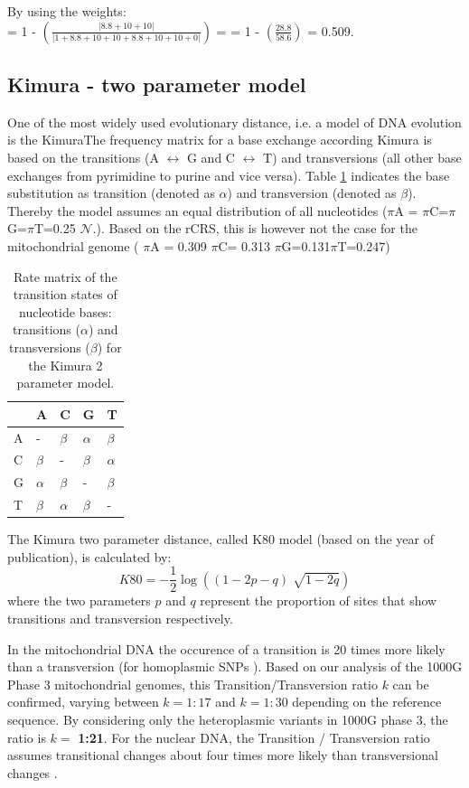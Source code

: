 By using the weights: \\
= 1 - $\left(  \frac{\left| 8.8 + 10 + 10 \right|}{\left| 1 + 8.8 + 10 + 10 + 8.8 + 10 + 10  + 0 \right|}  \right)$  = 
= 1 -  $\left(  \frac{28.8}{58.6} \right)$ = 0.509. 
\subsection{Kimura - two parameter model}
One of the most widely used evolutionary distance, i.e. a model of DNA evolution is the KimuraThe frequency matrix for a base exchange according Kimura \cite{Kimura1980} is based on the transitions (A $\leftrightarrow$ G and C $\leftrightarrow$ T) and transversions (all other base exchanges from pyrimidine to purine and vice versa). Table \ref{hg:kimuratable} indicates the base substitution as transition (denoted as $\alpha$) and transversion (denoted as $\beta$). Thereby the model assumes an equal distribution of all nucleotides ($\pi$A = $\pi$C=$\pi$G=$\pi$T=0.25 $\mathcal{N}.$). Based on the rCRS, this is however not the case for the mitochondrial genome ( $\pi$A = 0.309 $\pi$C= 0.313 $\pi$G=0.131$\pi$T=0.247)
\begin{table}[h]

\centering
\caption{Rate matrix of the transition states of nucleotide bases: transitions ($\alpha$) and transversions ($\beta$) for the Kimura 2 parameter model.}
\label{hg:kimuratable}
\begin{tabular}{lllll}
\hline
   & A&  C   &G  & T\\
\hline

A  & - & $\beta$    & $\alpha$  & $\beta$ \\
C  & $\beta$ &  -   & $\beta$  & $\alpha$ \\
G  & $\alpha$ &  $\beta$    & - & $\beta$ \\
T  & $\beta$ &  $\alpha$    & $\beta$  & - \\
\end{tabular}
\end{table}

The Kimura two parameter distance, called K80 model (based on the year of publication), is calculated by:
\begin{equation}
K80 = - \frac{1}{2} \log((1- 2p -q ) \sqrt[]{1-2q})
\end{equation}
where the two parameters $p$ and $q$ represent the proportion of sites that show transitions and transversion respectively.

In the mitochondrial DNA the occurence of a transition is 20 times more likely than a transversion (for homoplasmic SNPs \cite{Guo2012}). Based on our analysis of the 1000G Phase 3 mitochondrial genomes, this Transition/Transversion ratio $k$ can be confirmed, varying between $k=1:17$ and $k=1:30$ depending on the reference sequence. By considering only the heteroplasmic variants in 1000G phase 3, the ratio is $k=$ \textbf{1:21}. For the nuclear DNA, the Transition / Transversion ratio assumes transitional changes about four times more likely than transversional changes \cite{salemi2009the}. 


